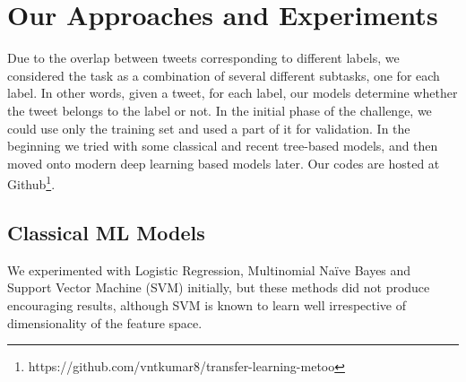 \section{Our Approaches and Experiments}
Due to the overlap between tweets corresponding to different labels, we considered the task as a combination of several different subtasks, one for each label.
In other words, given a tweet, for each label, our models determine whether the tweet belongs to the label or not. 
In the initial phase of the challenge, we could use only the training set and used a part of it for validation. In the beginning we tried with some classical and recent tree-based models, and then moved onto modern deep learning based models later. Our codes are hosted at Github\footnote{{https://github.com/vntkumar8/transfer-learning-metoo}}.
\subsection{Classical ML Models}

We experimented with Logistic Regression, Multinomial Na\"ive Bayes and Support Vector Machine (SVM) initially, but these methods did not produce encouraging results, although SVM is known to learn well irrespective of dimensionality of the feature space.

